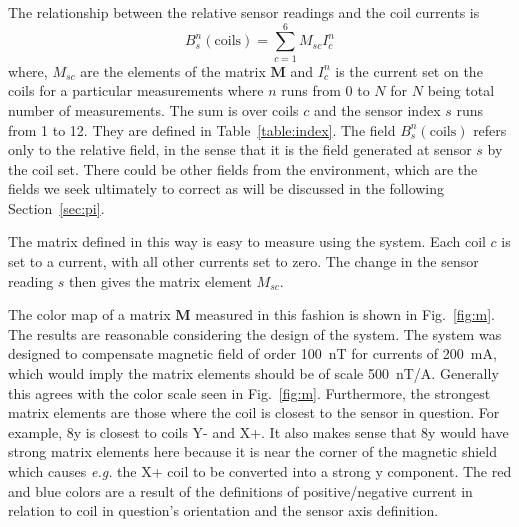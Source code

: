 The relationship between the relative sensor readings and the coil currents is
\begin{equation}\label{eq:B_coils}
    B_s^n(\mathrm{coils})=\sum_{c=1}^{6} M_{sc} I_c^n
\end{equation}
where, $M_{sc}$ are the elements of the matrix $\bm{M}$ and $I_c^n$ is the current set on the coils for a particular measurements where $n$ runs from 0 to $N$ for $N$ being total number of measurements. The sum is over coils $c$ and the sensor index $s$ runs from 1 to 12. They are defined in Table~\ref{table:index}. The field $B_s^n(\mathrm{coils})$ refers only to the relative field, in the sense that it is the field generated at sensor $s$ by the coil set. There could be other fields from the environment, which are the fields we seek ultimately to correct as will be discussed in the following Section~\ref{sec:pi}.






The matrix defined in this way is easy to measure using the system.  Each coil $c$ is set to a current, with all other currents set to zero.  The change in the sensor reading $s$ then gives the matrix element $M_{sc}$. 



The color map of a matrix $\bm{M}$ measured in this fashion is shown in Fig.~\ref{fig:m}.  The results are reasonable considering the design of the system.  The system was designed to compensate magnetic field of order 100~nT for currents of 200~mA, which would imply the matrix elements should be of scale 500~nT/A.  Generally this agrees with the color scale seen in Fig.~\ref{fig:m}.  Furthermore, the strongest matrix elements are those where the coil is closest to the sensor in question.  For example, 8y is closest to coils Y- and X+.  It also makes sense that 8y would have strong matrix elements here because it is near the corner of the magnetic shield which causes {\it e.g.} the X+ coil to be converted into a strong y component.  The red and blue colors are a result of the definitions of positive/negative current in relation to coil in question's orientation and the sensor axis definition.




